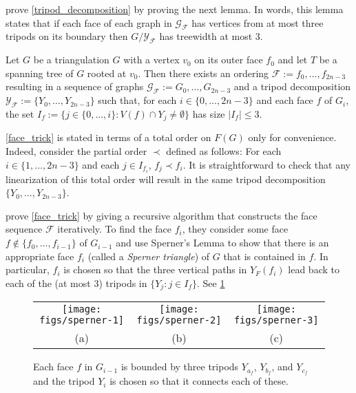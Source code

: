 \documentclass{patmorin}
\begin{document}
\citet{dujmovic.joret.ea:planar} prove \cref{tripod_decomposition} by proving the next lemma.  In words, this lemma states that if each face of each graph in $\mathcal{G}_{\mathcal{F}}$ has vertices from at most three tripods on its boundary then $G/\mathcal{Y}_\mathcal{F}$ has treewidth at most $3$.

\begin{lem}\label{face_trick}
  Let $G$ be a triangulation $G$ with a vertex $v_0$ on its outer face $f_0$ and let $T$ be a spanning tree of $G$ rooted at $v_0$.  Then there exists an ordering $\mathcal{F}:=f_0,\ldots,f_{2n-3}$ resulting in a sequence of graphs $\mathcal{G_F}:= G_0,\ldots,G_{2n-3}$ and a tripod decomposition $\mathcal{Y_F}:=\{Y_0,\ldots,Y_{2n-3}\}$ such that, for each $i\in\{0,\ldots,2n-3\}$ and each face $f$ of $G_i$, the set $I_f:=\{j\in\{0,\ldots,i\}: V(f)\cap Y_{j}\neq\emptyset\}$ has size  $|I_f|\le 3$.
\end{lem}

\begin{rem}
  \cref{face_trick} is stated in terms of a total order on $F(G)$ only for convenience.  Indeed, consider the partial order $\prec$ defined as follows:  For each $i\in\{1,\ldots,2n-3\}$ and each $j\in I_{f_i}$, $f_j\prec f_i$.  It is straightforward to check that any linearization of this total order will result in the same tripod decomposition $\{Y_0,\ldots,Y_{2n-3}\}$.
\end{rem}

\citet{dujmovic.joret.ea:planar} prove \cref{face_trick} by giving a recursive algorithm that constructs the face sequence $\mathcal{F}$ iteratively.  To find the face $f_i$, they consider some face $f\not\in\{f_0,\ldots,f_{i-1}\}$ of $G_{i-1}$ and use Sperner's Lemma to show that there is an appropriate face $f_i$ (called a \emph{Sperner triangle}) of $G$ that is contained in $f$. In particular, $f_i$ is chosen so that the three vertical paths in $Y_F(f_i)$ lead back to each of the (at most 3) tripods in $\{Y_j:j\in I_f\}$. See \cref{sperner}

\begin{figure}
  \begin{center}
    \begin{tabular}{ccc}
      \texttt{[image: figs/sperner-1]} &
      \texttt{[image: figs/sperner-2]} &
      \texttt{[image: figs/sperner-3]} \\
      (a) & (b) & (c)
    \end{tabular}
  \end{center}
  \caption{Each face $f$ in $G_{i-1}$ is bounded by three tripods $Y_{a_f}$, $Y_{b_f}$, and $Y_{c_f}$ and the tripod $Y_i$ is chosen so that it connects each of these.}
  \label{sperner}
\end{figure}
\end{document}
